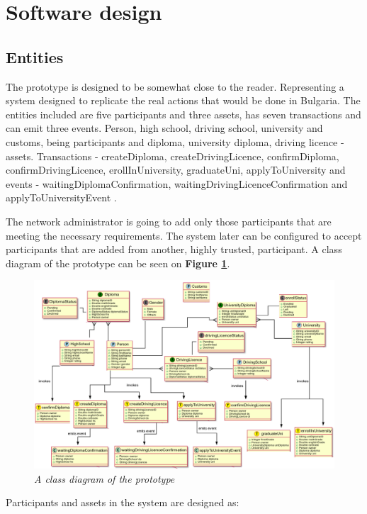 \documentclass[a4paper,11pt]{report}
\begin{document}
\section{Software design}

\subsection{Entities}


The prototype is designed to be somewhat close to the reader. Representing a system designed to replicate the real actions that would be done in Bulgaria. The entities included are five participants and three assets, has seven transactions and can emit three events. Person, high school, driving school, university and customs, being participants and diploma, university diploma, driving licence - assets. Transactions - createDiploma, createDrivingLicence, confirmDiploma, confirmDrivingLicence, erollInUniversity, graduateUni, applyToUniversity and events - waitingDiplomaConfirmation, waitingDrivingLicenceConfirmation and applyToUniversityEvent . 

The network administrator is going to add only those participants that are meeting the necessary requirements. The system later can be configured to accept participants that are added from another, highly trusted, participant. A class diagram of the prototype can be seen on \textbf{Figure \ref{classDiagram}}.


\begin{figure}[h]
\centering
  \includegraphics[width=16cm]{classDiagram.png}
  \caption{\textit{A class diagram of the prototype}}
  \label{classDiagram}
\end{figure}


Participants and assets in the system are designed as:
\end{document}
